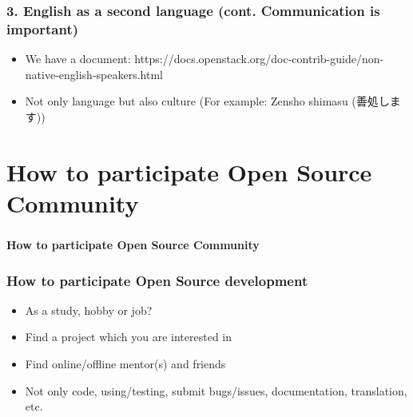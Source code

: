 \documentclass[aspectratio=169,11pt,hyperref={colorlinks=true}]{beamer}
\begin{document}
\begin{frame}
  \frametitle{3. English as a second language (cont. Communication is important)}
  \begin{itemize}
    \item We have a document: https://docs.openstack.org/doc-contrib-guide/non-native-english-speakers.html
    \item Not only language but also culture (For example: Zensho shimasu (善処します))
  \end{itemize}
\end{frame}

\section{How to participate Open Source Community}
\begin{frame}
  \frametitle{ }
  \Huge{\bf{How to participate Open Source Community}}
\end{frame}

\begin{frame}
  \frametitle{How to participate Open Source development}
  \begin{itemize}
    \item As a study, hobby or job?
    \item Find a project which you are interested in
    \item Find online/offline mentor(s) and friends
    \item Not only code, using/testing, submit bugs/issues, documentation, translation, etc.
  \end{itemize}
\end{frame}
\end{document}
